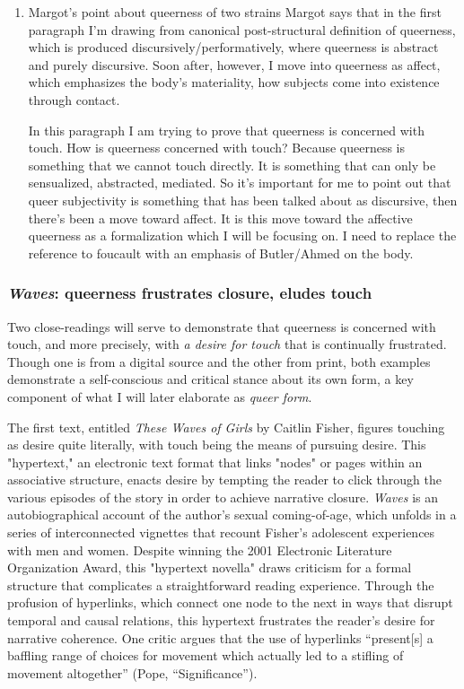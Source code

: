 \documentclass[11pt]{article}
\begin{document}
\begin{enumerate}
\item Margot's point about queerness of two strains
\label{sec:orgedd37bd}
Margot says that in the first paragraph I'm drawing from canonical
post-structural definition of queerness, which is produced
discursively/performatively, where queerness is abstract and purely
discursive. Soon after, however, I move into queerness as affect,
which emphasizes the body's materiality, how subjects come into
existence through contact.

In this paragraph I am trying to prove that queerness is concerned
with touch. How is queerness concerned with touch? Because queerness
is something that we cannot touch directly. It is something that can
only be sensualized, abstracted, mediated. So it's important for me to
point out that queer subjectivity is something that has been talked
about as discursive, then there's been a move toward affect. It is
this move toward the affective queerness as a formalization which I
will be focusing on. I need to replace the reference to foucault with
an emphasis of Butler/Ahmed on the body.
\end{enumerate}

\subsubsection{\emph{Waves}: queerness frustrates closure, eludes touch}
\label{sec:orgd2c0417}

Two close-readings will serve to demonstrate that queerness is
concerned with touch, and more precisely, with \emph{a desire for touch}
that is continually frustrated. Though one is from a digital source
and the other from print, both examples demonstrate a self-conscious
and critical stance about its own form, a key component of what I will
later elaborate as \emph{queer form}.

The first text, entitled \emph{These Waves of Girls} by Caitlin Fisher,
figures touching as desire quite literally, with touch being the means
of pursuing desire. This "hypertext," an electronic text format that
links "nodes" or pages within an associative structure, enacts desire
by tempting the reader to click through the various episodes of the
story in order to achieve narrative closure. \emph{Waves} is an
autobiographical account of the author's sexual coming-of-age, which
unfolds in a series of interconnected vignettes that recount Fisher's
adolescent experiences with men and women. Despite winning the 2001
Electronic Literature Organization Award, this "hypertext novella"
draws criticism for a formal structure that complicates a
straightforward reading experience. Through the profusion of
hyperlinks, which connect one node to the next in ways that disrupt
temporal and causal relations, this hypertext frustrates the reader’s
desire for narrative coherence. One critic argues that the
use of hyperlinks “present[s] a baffling range of choices for movement
which actually led to a stifling of movement altogether” (Pope,
“Significance”).
\end{document}
